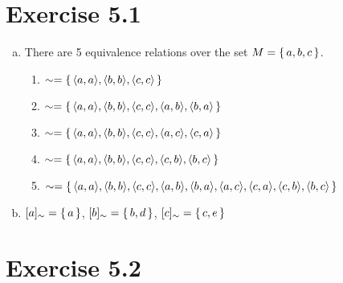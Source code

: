 \documentclass{article} %
\newcommand{\homeworkNumber}{5}
\begin{document}
\section*{Exercise \homeworkNumber.1}

\begin{enumerate}[a)]

	\item There are 5 equivalence relations over the set $M = \set{a,b,c}$.
	
	\begin{enumerate}[]
		\item $\sim = \set{\langle a, a \rangle, \langle b, b \rangle, \langle c, c \rangle}$
		\item $\sim = \set{\langle a, a \rangle, \langle b, b \rangle, \langle c, c \rangle, \langle a, b \rangle, \langle b, a \rangle}$
		\item $\sim = \set{\langle a, a \rangle, \langle b, b \rangle, \langle c, c \rangle, \langle a, c \rangle, \langle c, a \rangle}$
		\item $\sim = \set{\langle a, a \rangle, \langle b, b \rangle, \langle c, c \rangle, \langle c, b \rangle, \langle b, c \rangle}$
		\item $\sim = \set{\langle a, a \rangle, \langle b, b \rangle, \langle c, c \rangle, \langle a, b \rangle, \langle b, a \rangle, \langle a, c \rangle, \langle c, a \rangle, \langle c, b \rangle, \langle b, c \rangle}$
		
	\end{enumerate}
	
	\item $[a]_\sim = \set{a}$, $[b]_\sim = \set{b,d}$, $[c]_\sim = \set{c,e}$
	
\end{enumerate}

\section*{Exercise \homeworkNumber.2}
\end{document}
